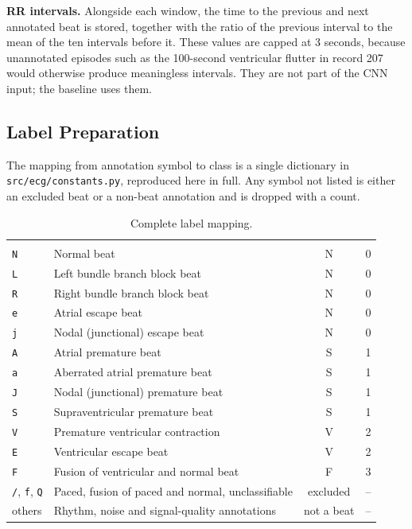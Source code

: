 \textbf{RR intervals.} Alongside each window, the time to the previous and next annotated beat is stored, together with the ratio of the previous interval to the mean of the ten intervals before it. These values are capped at 3 seconds, because unannotated episodes such as the 100-second ventricular flutter in record 207 would otherwise produce meaningless intervals. They are not part of the CNN input; the baseline uses them.

\subsection{Label Preparation}

The mapping from annotation symbol to class is a single dictionary in \texttt{src/ecg/constants.py}, reproduced here in full. Any symbol not listed is either an excluded beat or a non-beat annotation and is dropped with a count.

\begin{table}[H]
  \centering
  \caption{Complete label mapping.}
  \label{tab:label-mapping}
  \begin{tabularx}{\linewidth}{l Y c c}
     &  &  &  \\
    \texttt{N} & Normal beat                          & N & 0 \\
    \texttt{L} & Left bundle branch block beat        & N & 0 \\
    \texttt{R} & Right bundle branch block beat       & N & 0 \\
    \texttt{e} & Atrial escape beat                   & N & 0 \\
    \texttt{j} & Nodal (junctional) escape beat       & N & 0 \\
    \texttt{A} & Atrial premature beat                & S & 1 \\
    \texttt{a} & Aberrated atrial premature beat      & S & 1 \\
    \texttt{J} & Nodal (junctional) premature beat    & S & 1 \\
    \texttt{S} & Supraventricular premature beat      & S & 1 \\
    \texttt{V} & Premature ventricular contraction    & V & 2 \\
    \texttt{E} & Ventricular escape beat              & V & 2 \\
    \texttt{F} & Fusion of ventricular and normal beat & F & 3 \\
    \midrule
    \texttt{/}, \texttt{f}, \texttt{Q} & Paced, fusion of paced and normal, unclassifiable & excluded & -- \\
    others & Rhythm, noise and signal-quality annotations & not a beat & -- \\
    \bottomrule
  \end{tabularx}

\end{table}


